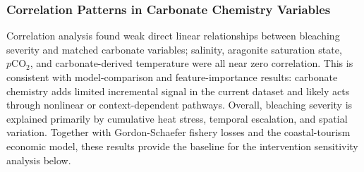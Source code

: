 \documentclass[10pt,letterpaper]{article}
\begin{document}
\subsubsection{Correlation Patterns in Carbonate Chemistry Variables}

Correlation analysis found weak direct linear relationships between bleaching severity and matched carbonate variables; salinity, aragonite saturation state, $p\mathrm{CO}_2$, and carbonate-derived temperature were all near zero correlation. This is consistent with model-comparison and feature-importance results: carbonate chemistry adds limited incremental signal in the current dataset and likely acts through nonlinear or context-dependent pathways. Overall, bleaching severity is explained primarily by cumulative heat stress, temporal escalation, and spatial variation. Together with Gordon-Schaefer fishery losses and the coastal-tourism economic model, these results provide the baseline for the intervention sensitivity analysis below.
\end{document}
